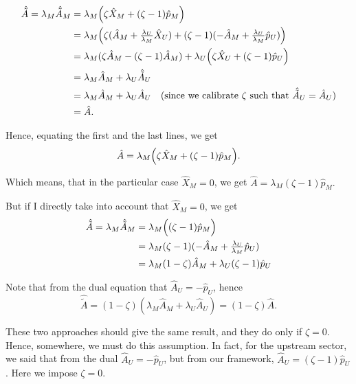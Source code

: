 \documentclass[11pt]{article}
\begin{document}
\begin{equation}
    \begin{aligned}
    \hat{\tilde{A}}=\lambda_M  \hat{\tilde{A}}_M 
    &= \lambda_M\Bigl(\zeta \hat{X}_M + (\zeta-1) \hat{p}_M\Bigr)\\
    &= \lambda_M\Bigl(\zeta(\hat{A}_M+ \tfrac{\lambda_U}{\lambda_M} \hat{X}_U )
        +  (\zeta-1) (-\hat{A}_M+\tfrac{\lambda_U}{\lambda_M} \hat{p}_U)\Bigr)\\
    &= \lambda_M (\zeta\hat{A}_M-(\zeta-1)\hat{A}_M)+\lambda_U\Bigl(\zeta \hat{X}_U + (\zeta-1) \hat{p}_U\Bigr)\\
    &= \lambda_M \hat{A}_M+\lambda_U \hat{\tilde{A}}_U\\
    &=\lambda_M \hat{A}_M+\lambda_U \hat{A}_U\quad(\text{since we calibrate }\zeta\text{ such that }\hat{\tilde{A}}_U=\hat{A}_U)\\
    &=\hat{A}.
\end{aligned}
\end{equation}

Hence, equating the first and the last lines, we get
\begin{equation}
 \hat{A}=    \lambda_M\Bigl(\zeta \hat{X}_M + (\zeta-1) \hat{p}_M\Bigr).
\end{equation}

Which means, that in the particular case $\hat{X}_M=0$, we get $ \hat{A}=    \lambda_M(\zeta-1) \hat{p}_M.
$

But if I directly take into account that $\hat{X}_M=0$, we get
\begin{equation}
    \begin{aligned}
    \hat{\tilde{A}}=\lambda_M  \hat{\tilde{A}}_M 
    &= \lambda_M\Bigl((\zeta-1) \hat{p}_M\Bigr)\\
    &= \lambda_M(\zeta-1) (-\hat{A}_M+\tfrac{\lambda_U}{\lambda_M} \hat{p}_U)\\
    &= \lambda_M(1-\zeta) \hat{A}_M +\lambda_U(\zeta-1)\hat{p}_U
\end{aligned}
\end{equation}

Note that from the dual equation that $\hat{A}_U=-\hat{p}_U$, hence
\begin{equation} 
     \hat{\tilde{A}}= (1-\zeta)\left(\lambda_M \hat{A}_M +\lambda_U\hat{A}_U\right)=
     (1-\zeta)\hat{A}.
\end{equation}

These two approaches should give the same result, and they do only if $\zeta=0$. Hence, somewhere, we must do this assumption. 
In fact, for the upstream sector, we said that from the dual  $\hat{A}_U=-\hat{p}_U$, but from our framework,  $\hat{A}_U=(\zeta-1)\hat{p}_U$. Here we impose $\zeta=0$. 
\end{document}
